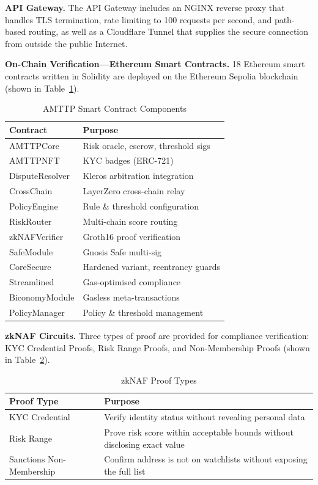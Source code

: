 \documentclass[journal]{IEEEtran}
\begin{document}
\textbf{API Gateway.} The API Gateway includes an NGINX reverse proxy that handles TLS termination, rate limiting to 100 requests per second, and path-based routing, as well as a Cloudflare Tunnel that supplies the secure connection from outside the public Internet.

\textbf{On-Chain Verification---Ethereum Smart Contracts.} 18 Ethereum smart contracts written in Solidity are deployed on the Ethereum Sepolia blockchain (shown in Table~\ref{tab:contracts}).

\begin{table}[!t]
\centering
\caption{AMTTP Smart Contract Components}
\label{tab:contracts}
\begin{tabular}{ll}
\toprule
\textbf{Contract} & \textbf{Purpose} \\
\midrule
AMTTPCore & Risk oracle, escrow, threshold sigs \\
AMTTPNFT & KYC badges (ERC-721) \\
DisputeResolver & Kleros arbitration integration \\
CrossChain & LayerZero cross-chain relay \\
PolicyEngine & Rule \& threshold configuration \\
RiskRouter & Multi-chain score routing \\
zkNAFVerifier & Groth16 proof verification \\
SafeModule & Gnosis Safe multi-sig \\
CoreSecure & Hardened variant, reentrancy guards \\
Streamlined & Gas-optimised compliance \\
BiconomyModule & Gasless meta-transactions \\
PolicyManager & Policy \& threshold management \\
\bottomrule
\end{tabular}
\end{table}

\textbf{zkNAF Circuits.} Three types of proof are provided for compliance verification: KYC Credential Proofs, Risk Range Proofs, and Non-Membership Proofs (shown in Table~\ref{tab:zknaf}).

\begin{table}[!t]
\centering
\caption{zkNAF Proof Types}
\label{tab:zknaf}
\begin{tabular}{p{2.8cm}p{4.8cm}}
\toprule
\textbf{Proof Type} & \textbf{Purpose} \\
\midrule
KYC Credential & Verify identity status without revealing personal data \\
Risk Range & Prove risk score within acceptable bounds without disclosing exact value \\
Sanctions Non-Membership & Confirm address is not on watchlists without exposing the full list \\
\bottomrule
\end{tabular}
\end{table}
\end{document}
